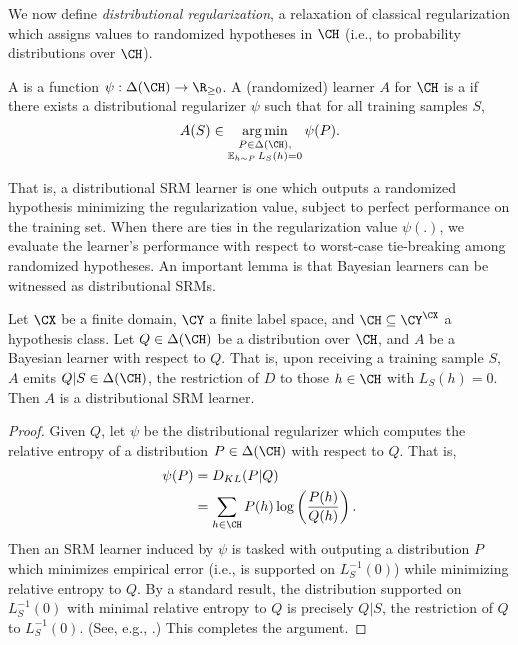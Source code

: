 \documentclass[11pt]{article}
\begin{document}
We now define \emph{distributional regularization}, a relaxation of classical regularization which assigns values to randomized hypotheses in $\CH$ (i.e., to probability distributions over $\CH$). 

\begin{definition}
A  is a function $\psi: \Delta(\CH) \to \R_{\geq 0}$. A (randomized) learner $A$ for $\CH$ is a  if there exists a distributional regularizer $\psi$ such that for all training samples $S$, 
\[ A(S) \in \argmin_{\substack{P \in \Delta(\CH), \\ \E_{h \sim P} L_S(h) = 0 }}  \psi(P) . \]
\end{definition}

That is, a distributional SRM learner is one which outputs a randomized hypothesis minimizing the regularization value, subject to perfect performance on the training set. When there are ties in the regularization value $\psi(.)$, we evaluate the learner's performance with respect to worst-case tie-breaking among randomized hypotheses. An important lemma is that Bayesian learners can be witnessed as distributional SRMs. 

\begin{lemma}\label{Lemma:bayesian-is-distributional-SRM}
Let $\CX$ be a finite domain, $\CY$ a finite label space, and $\CH \subseteq \CY^\CX$ a hypothesis class. Let $Q \in \Delta(\CH)$ be a distribution over $\CH$, and $A$ be a Bayesian learner with respect to $Q$. That is, upon receiving a training sample $S$, $A$ emits $Q|S \in \Delta(\CH)$, the restriction of $D$ to those $h \in \CH$ with $L_S(h) = 0$. Then $A$ is a distributional SRM learner. 
\end{lemma} 
\begin{proof}
Given $Q$, let $\psi$ be the distributional regularizer which computes the relative entropy of a distribution $P \in \Delta(\CH)$ with respect to $Q$. That is, 
\begin{align*}
\psi(P) &= D_{KL}(P | Q) \\ 
&= \sum_{h \in \CH} P(h) \log \left( \frac{P(h)}{Q(h)} \right). 
\end{align*}
Then an SRM learner induced by $\psi$ is tasked with outputing a distribution $P$ which minimizes empirical error (i.e., is supported on $L_{S}^{-1}(0)$) while minimizing relative entropy to $Q$. By a standard result, the distribution supported on $L_{S}^{-1}(0)$ with minimal relative entropy to $Q$ is precisely $Q | S$, the restriction of $Q$ to $L_{S}^{-1}(0)$. (See, e.g., \citet[Lemma~55]{asilis2024regularization}.) This completes the argument.
\end{proof}
\end{document}
